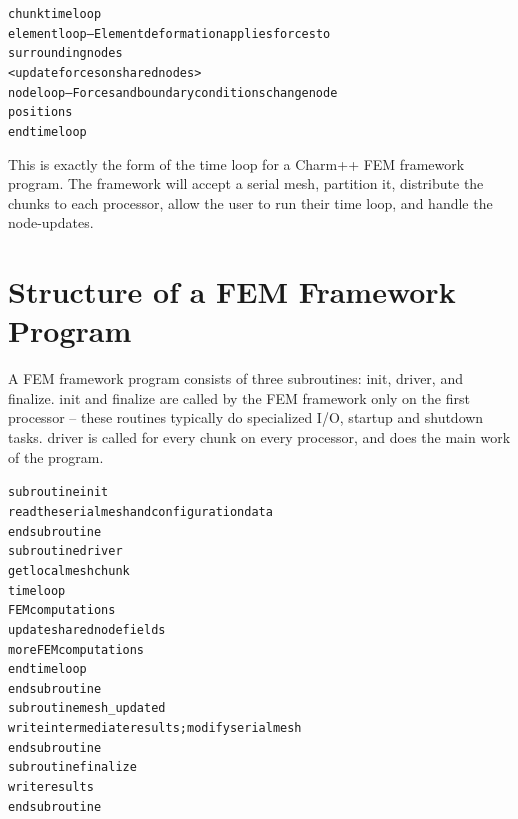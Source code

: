 \documentclass[11pt]{article}
\begin{document}
\begin{alltt}
     chunk time loop\\
          element loop-- Element deformation applies forces to
          surrounding nodes\\
          <update forces on shared nodes>\\
          node loop-- Forces and boundary conditions change node
          positions\\
     end time loop\\
\end{alltt}

This is exactly the form of the time loop for a Charm++ FEM framework
program.  The framework will accept a serial mesh, partition it, distribute
the chunks to each processor, allow the user to run their time loop, and
handle the node-updates.


\section{Structure of a FEM Framework Program}

A FEM framework program consists of three subroutines: init, driver, and
finalize.  init and finalize are called by the FEM framework only on the
first processor -- these routines typically do specialized I/O, startup and
shutdown tasks.  driver is called for every chunk on every processor, and
does the main work of the program.

\begin{alltt}
     subroutine init\\
          read the serial mesh and configuration data\\
     end subroutine\\
     subroutine driver\\
          get local mesh chunk\\
          time loop\\
               FEM computations\\
               update shared node fields\\
               more FEM computations\\
          end time loop\\
     end subroutine\\
     subroutine mesh\_updated\\
          write intermediate results; modify serial mesh\\
     end subroutine\\
     subroutine finalize\\
           write results\\
     end subroutine\\
\end{alltt}
\end{document}
